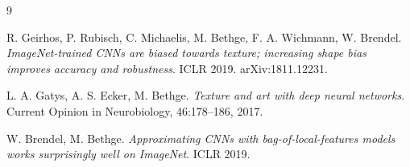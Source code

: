 \documentclass[11pt]{article}
\begin{document}
\begin{thebibliography}{9}

R. Geirhos, P. Rubisch, C. Michaelis, M. Bethge, F. A. Wichmann, W. Brendel.
\emph{ImageNet-trained CNNs are biased towards texture; increasing shape bias
improves accuracy and robustness}. ICLR 2019. arXiv:1811.12231.

L. A. Gatys, A. S. Ecker, M. Bethge.
\emph{Texture and art with deep neural networks}.
Current Opinion in Neurobiology, 46:178--186, 2017.

W. Brendel, M. Bethge.
\emph{Approximating CNNs with bag-of-local-features models works surprisingly
well on ImageNet}. ICLR 2019.

\end{thebibliography}
\end{document}
